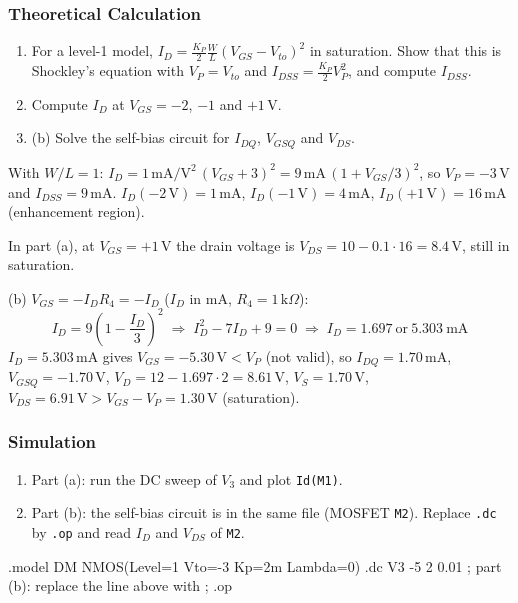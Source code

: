 \subsubsection*{Theoretical Calculation}
\begin{enumerate}[itemsep=2pt]
  \item For a level-1 model, $I_D = \tfrac{K_P}{2}\tfrac{W}{L}(V_{GS}-V_{to})^2$ in saturation. Show that this is Shockley's
        equation with $V_P = V_{to}$ and $I_{DSS} = \tfrac{K_P}{2}V_P^2$, and compute $I_{DSS}$.
  \item Compute $I_D$ at $V_{GS} = -2$, $-1$ and $+1$\,V.
  \item (b) Solve the self-bias circuit for $I_{DQ}$, $V_{GSQ}$ and $V_{DS}$.
\end{enumerate}
\begin{solution}
With $W/L = 1$: $I_D = 1\,\mathrm{mA/V^2}\,(V_{GS}+3)^2 = 9\,\mathrm{mA}\,(1+V_{GS}/3)^2$, so $V_P = -3$\,V and $I_{DSS} = 9$\,mA.
$I_D(-2\,\mathrm{V}) = 1$\,mA, $I_D(-1\,\mathrm{V}) = 4$\,mA, $I_D(+1\,\mathrm{V}) = 16$\,mA (enhancement region).

In part (a), at $V_{GS} = +1$\,V the drain voltage is $V_{DS} = 10 - 0.1\cdot16 = 8.4$\,V, still in saturation.

(b) $V_{GS} = -I_D R_4 = -I_D$ ($I_D$ in mA, $R_4 = 1\,\mathrm{k}\Omega$):
\[
  I_D = 9\left(1-\frac{I_D}{3}\right)^2 \;\Rightarrow\; I_D^2 - 7I_D + 9 = 0 \;\Rightarrow\; I_D = 1.697\ \text{or}\ 5.303\ \mathrm{mA}
\]
$I_D = 5.303$\,mA gives $V_{GS} = -5.30\,\mathrm{V} < V_P$ (not valid), so $I_{DQ} = 1.70$\,mA, $V_{GSQ} = -1.70$\,V,
$V_D = 12 - 1.697\cdot2 = 8.61$\,V, $V_S = 1.70$\,V, $V_{DS} = 6.91\,\mathrm{V} > V_{GS}-V_P = 1.30$\,V (saturation).
\end{solution}

\subsubsection*{Simulation}
\begin{enumerate}[itemsep=2pt]
  \item Part (a): run the DC sweep of $V_3$ and plot \texttt{Id(M1)}.
  \item Part (b): the self-bias circuit is in the same file (MOSFET \texttt{M2}). Replace \texttt{.dc} by \texttt{.op} and read $I_D$ and $V_{DS}$ of \texttt{M2}.
\end{enumerate}
\begin{spice}
.model DM NMOS(Level=1 Vto=-3 Kp=2m Lambda=0)
.dc V3 -5 2 0.01
; part (b): replace the line above with
; .op
\end{spice}

